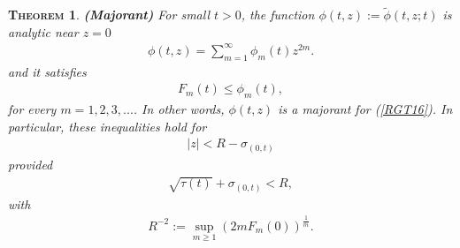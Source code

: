 \documentclass[12pt,twoside]{amsart}
\newtheorem{theo}{\textsc{Theorem}}[section]
\numberwithin{equation}{section}
\begin{document}
\begin{theo} \label{majorant} \textup{\textbf{(Majorant)}} For small $t > 0$, the function $\phi(t,z) := \tilde{\phi}(t,z;t)$ is analytic near $z = 0$ 
\begin{eqnarray}
\phi(t,z) = \sum_{m=1}^{\infty}\phi_{m}(t)z^{2m}. \label{MM7}
\end{eqnarray}
and it satisfies
\begin{eqnarray}
F_{m}(t) \le \phi_{m}(t), \label{MM8}
\end{eqnarray}
for every $m=1,2,3,...$. In other words, $\phi(t,z)$ is a majorant for (\ref{RGT16}). In particular, these inequalities hold for 
\begin{eqnarray}
|z| < R-\sigma_{(0,t)} \label{MM9}
\end{eqnarray}
provided 
\begin{eqnarray}
\sqrt{\tau(t)}+\sigma_{(0,t)}< R, \label{MM10}
\end{eqnarray}
with
\begin{eqnarray}
R^{-2} := \sup_{m \ge 1}(2m F_{m}(0))^{\frac{1}{m}}. \label{MM11}
\end{eqnarray}
\end{theo}
\end{document}
